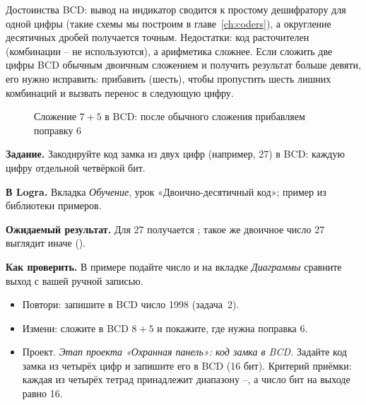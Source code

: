 Достоинства BCD: вывод на индикатор сводится к простому дешифратору для одной
цифры (такие схемы мы построим в главе~\ref{ch:coders}), а округление
десятичных дробей получается точным. Недостатки: код расточителен
(комбинации -- не используются), а арифметика сложнее.
Если сложить две цифры BCD обычным двоичным сложением и получить результат
больше девяти, его нужно исправить: прибавить  (шесть), чтобы
пропустить шесть лишних комбинаций и вызвать перенос в следующую цифру.

\begin{figure}[H]
\centering
{}
\caption{Сложение $7+5$ в BCD: после обычного сложения прибавляем поправку 6}
\end{figure}

\begin{diybox}
\textbf{Задание.} Закодируйте код замка из двух цифр (например, 27) в BCD:
каждую цифру отдельной четвёркой бит.\par
\textbf{В Logra.} Вкладка \emph{Обучение}, урок «Двоично-десятичный код»;
пример  из библиотеки примеров.\par
\textbf{Ожидаемый результат.} Для 27 получается ; такое же
двоичное число 27 выглядит иначе ().\par
\textbf{Как проверить.} В примере  подайте число и на
вкладке \emph{Диаграммы} сравните выход с вашей ручной записью.
\begin{itemize}[leftmargin=3.4em,labelwidth=3em,labelsep=0.4em,align=left]
  \item[\stars{1}] Повтори: запишите в BCD число 1998 (задача~2).
  \item[\stars{2}] Измени: сложите в BCD $8+5$ и покажите, где нужна поправка 6.
  \item[\stars{3}] Проект. \emph{Этап проекта «Охранная панель»: код замка в
    BCD.} Задайте код замка из четырёх цифр и запишите его в BCD
    (16 бит). Критерий приёмки: каждая из четырёх тетрад принадлежит
    диапазону --, а число бит на выходе равно 16.
\end{itemize}
\end{diybox}

